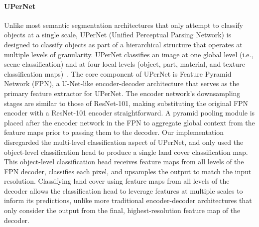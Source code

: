 \paragraph{UPerNet}
Unlike most semantic segmentation architectures that only attempt to classify objects at a single scale, UPerNet (Unified Perceptual Parsing Network) is designed to classify objects as part of a hierarchical structure that operates at multiple levels of granularity.
UPerNet classifies an image at one global level (i.e., scene classification) and at four local levels (object, part, material, and texture classification maps)~\citep{xiaoUnifiedPerceptualParsing2018}.
The core component of UPerNet is Feature Pyramid Network (FPN), a U-Net-like encoder-decoder architecture that serves as the primary feature extractor for UPerNet.
The encoder network's downsampling stages are similar to those of ResNet-101, making substituting the original FPN encoder with a ResNet-101 encoder straightforward.
A pyramid pooling module is placed after the encoder network in the FPN to aggregate global context from the feature maps prior to passing them to the decoder.
Our implementation disregarded the multi-level classification aspect of UPerNet, and only used the object-level classification head to produce a single land cover classification map.
This object-level classification head receives feature maps from all levels of the FPN decoder, classifies each pixel, and upsamples the output to match the input resolution.
Classifying land cover using feature maps from all levels of the decoder allows the classification head to leverage features at multiple scales to inform its predictions, unlike more traditional encoder-decoder architectures that only consider the output from the final, highest-resolution feature map of the decoder.




